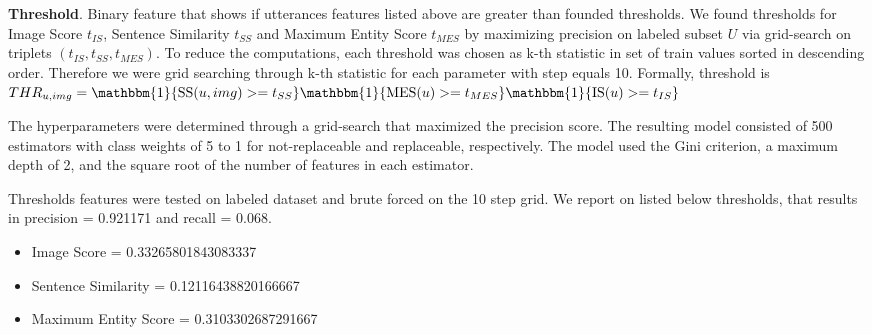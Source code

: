 \smallskip

\textbf{Threshold}. Binary feature that shows if utterances features listed above are greater than founded thresholds. We found thresholds for Image Score $t_{IS}$, Sentence Similarity $t_{SS}$ and Maximum Entity Score $t_{MES}$ by maximizing precision on labeled subset $U$ via grid-search on triplets $(t_{IS}, t_{SS}, t_{MES})$. To reduce the computations, each threshold was chosen as k-th statistic in set of train values sorted in descending order. Therefore we were grid searching through k-th statistic for each parameter with step equals 10. Formally, threshold is $THR_{u, img} =  \mathbbm{1} \{\operatorname{SS}(u,img) >= t_{SS}\} \mathbbm{1} \{\operatorname{MES}(u) >= t_{MES}\} \mathbbm{1} \{\operatorname{IS}(u) >= t_{IS}\}$

\smallskip

The hyperparameters were determined through a grid-search that maximized the precision score. The resulting model consisted of 500 estimators with class weights of 5 to 1 for not-replaceable and replaceable, respectively. The model used the Gini criterion, a maximum depth of 2, and the square root of the number of features in each estimator.



\smallskip

Thresholds features were tested on labeled dataset and brute forced on the 10 step grid. We report on listed below thresholds, that results in precision = 0.921171 and recall = 0.068.
    \begin{itemize}
        \item Image Score = 0.33265801843083337
        \item Sentence Similarity = 0.12116438820166667
        \item Maximum Entity Score = 0.3103302687291667
    \end{itemize}

\medskip

